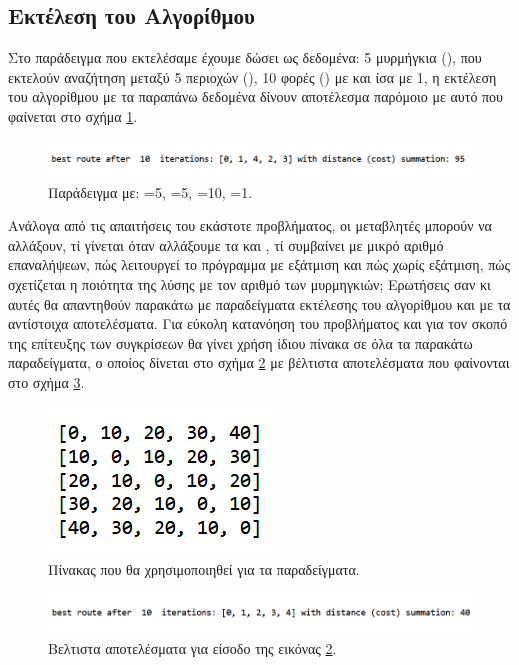 \subsection{Εκτέλεση του Αλγορίθμου}
Στο παράδειγμα που εκτελέσαμε έχουμε δώσει ως δεδομένα: 5 μυρμήγκια (), που εκτελούν αναζήτηση μεταξύ 5 περιοχών (), 10 φορές () με  και  ίσα με 1, η εκτέλεση του αλγορίθμου με τα παραπάνω δεδομένα δίνουν αποτέλεσμα παρόμοιο με αυτό που φαίνεται στο σχήμα \ref{12}.

\begin{figure}
    \centering
    \includegraphics[scale=0.65]{2947_thesis/pictures/ex1.png} 
    \caption{Παράδειγμα με: =5, =5, =10, =1.}
    \label{12}
\end{figure}

Ανάλογα από τις απαιτήσεις του εκάστοτε προβλήματος, οι μεταβλητές μπορούν να αλλάξουν, τί γίνεται όταν αλλάξουμε τα  και , τί συμβαίνει με μικρό αριθμό επαναλήψεων, πώς λειτουργεί το πρόγραμμα με εξάτμιση και πώς χωρίς εξάτμιση, πώς σχετίζεται η ποιότητα της λύσης με τον αριθμό των μυρμηγκιών; Ερωτήσεις σαν κι αυτές θα απαντηθούν παρακάτω με παραδείγματα εκτέλεσης του αλγορίθμου και με τα αντίστοιχα αποτελέσματα. 
Για εύκολη κατανόηση του προβλήματος και για τον σκοπό της επίτευξης των συγκρίσεων θα γίνει χρήση ίδιου πίνακα  σε όλα τα παρακάτω παραδείγματα, ο οποίος δίνεται στο σχήμα \ref{13} με βέλτιστα αποτελέσματα που φαίνονται στο σχήμα \ref{14}.
\begin{figure}
    \centering
    \includegraphics[scale=1]{2947_thesis/pictures/distance.png} 
    \caption{Πίνακας  που θα χρησιμοποιηθεί για τα παραδείγματα.}
    \label{13}
\end{figure}
\begin{figure}
    \centering
    \includegraphics[scale=0.65]{2947_thesis/pictures/ex2.png} 
    \caption{Βελτιστα αποτελέσματα για είσοδο  της εικόνας \ref{13}.}
    \label{14}
\end{figure}

